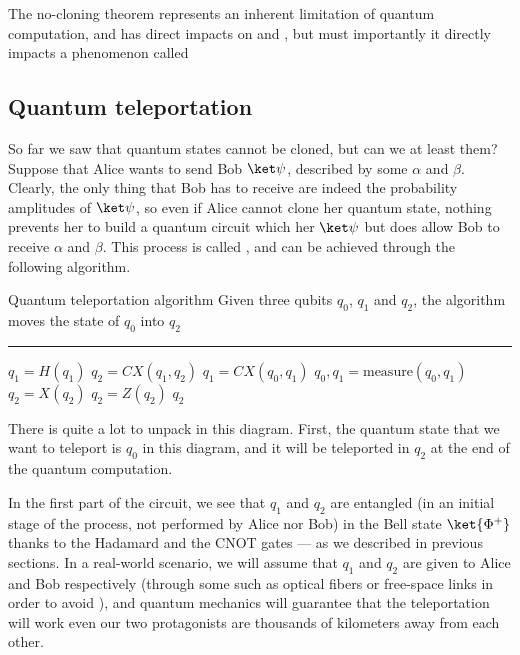 \documentclass[a4paper, 12pt]{report}
\begin{document}
The no-cloning theorem represents an inherent limitation of quantum computation, and has direct impacts on  and , but must importantly it directly impacts a phenomenon called 

\subsection{Quantum teleportation} \label{quantum teleportation}

So far we saw that quantum states cannot be cloned, but can we at least  them? Suppose that Alice wants to send Bob $\ket \psi$, described by some $\alpha$ and $\beta$. Clearly, the only thing that Bob has to receive are indeed the probability amplitudes of $\ket \psi$, so even if Alice cannot clone her quantum state, nothing prevents her to build a quantum circuit which  her $\ket \psi$ but does allow Bob to receive $\alpha$ and $\beta$. This process is called , and can be achieved through the following algorithm.

\begin{framedalgo}{Quantum teleportation algorithm}
    Given three qubits $q_0$, $q_1$ and $q_2$, the algorithm moves the state of $q_0$ into $q_2$ \\
    \hrule

    \quad
    \begin{algorithmic}[1]
            \State $q_1 = H(q_1)$
            \State $q_2 = CX(q_1, q_2)$ 
            \State $q_1 = CX(q_0, q_1)$
            \State $q_0, q_1 = \mbox{measure}(q_0, q_1)$
                \State $q_2 = X(q_2)$
            \EndIf
                \State $q_2 = Z(q_2)$
            \EndIf
            \State {} $q_2$
        \EndFunction
    \end{algorithmic}
\end{framedalgo}


There is quite a lot to unpack in this diagram. First, the quantum state that we want to teleport is $q_0$ in this diagram, and it will be teleported in $q_2$ at the end of the quantum computation.

In the first part of the circuit, we see that $q_1$ and $q_2$ are entangled (in an initial stage of the process, not performed by Alice nor Bob) in the Bell state $\ket{\Phi^+}$ thanks to the Hadamard and the CNOT gates --- as we described in previous sections. In a real-world scenario, we will assume that $q_1$ and $q_2$ are given to Alice and Bob respectively (through some  such as optical fibers or free-space links in order to avoid ), and quantum mechanics will guarantee that the teleportation will work even our two protagonists are thousands of kilometers away from each other.
\end{document}
